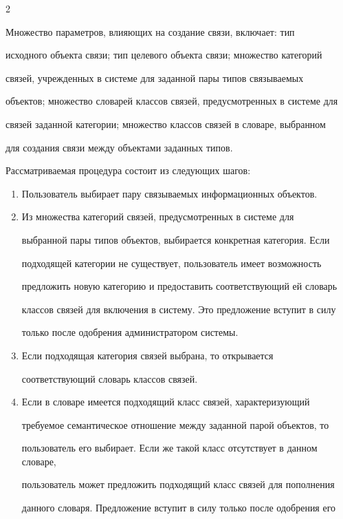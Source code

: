 \begin{multicols}{2}
  


  Множество параметров, влияющих на создание связи, включает: тип 


исходного объекта связи; тип целевого объекта связи; множество категорий 


связей, учрежденных в системе для заданной пары типов связываемых 


объектов; множество словарей классов связей, предусмотренных в системе для 


связей заданной категории; множество классов связей в словаре, выбранном 


для создания связи между объектами заданных типов.


  


  Рассматриваемая процедура состоит из сле\-ду\-ющих шагов: 


  \begin{enumerate}[1.]


\item  Пользователь выбирает пару связываемых информационных объектов.


  \item Из множества категорий связей, предусмотренных в системе для 


выбранной пары типов объектов, выбирается конкретная категория. Если 


подходящей категории не существует, пользователь имеет возможность 


предложить новую категорию и предоставить соответствующий ей словарь 


классов связей для включения в систему. Это предложение вступит в силу 


только после одобрения администратором системы. 


  \item Если подходящая категория связей выбрана, то открывается 


соответствующий словарь классов связей. 


  \item Если в словаре имеется подходящий класс связей, характеризующий 


требуемое семантическое отношение между заданной парой объектов, то 


пользователь его выбирает. Если же такой класс отсутствует в данном словаре, 


пользователь может предложить подходящий класс связей для пополнения 


данного словаря. Предложение вступит в силу только после одобрения его 



\end{enumerate}
\end{multicols}
